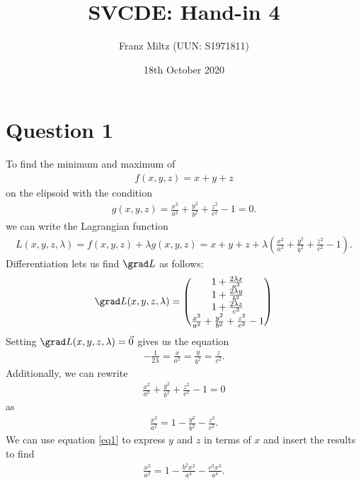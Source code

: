 \documentclass{article}
\begin{document}
\title{SVCDE: Hand-in 4}
\author{Franz Miltz (UUN: S1971811)}
\date{18th October 2020}
\maketitle


\section*{Question 1}


To find the minimum and maximum of
\begin{align*}
	f(x,y,z)=x + y + z
\end{align*}
on the elipsoid with the condition
\begin{align*}
	g(x,y,z)=\frac{x^2}{a^2} + \frac{y^2}{b^2} + \frac{z^2}{c^2}-1=0.
\end{align*}
we can write the Lagrangian function
\begin{align*}
	L(x,y,z,\lambda) = f(x,y,z)+\lambda g(x,y,z) =  x + y + z + \lambda\left(\frac{x^2}{a^2}+\frac{y^2}{b^2}+\frac{z^2}{c^2}-1\right).
\end{align*}
Differentiation lets us find $\grad L$ as follows:
\begin{align*}
	\grad L(x,y,z,\lambda)=\begin{pmatrix}
		1+\frac{2\lambda x}{a^2} \\
		1+\frac{2\lambda y}{b^2} \\
		1+\frac{2\lambda z}{c^2} \\
		\frac{x^2}{a^2}+\frac{y^2}{b^2}+\frac{z^2}{c^2}-1
	\end{pmatrix}
\end{align*}
Setting $\grad L(x,y,z,\lambda)=\vec 0$ gives us the equation
\begin{align}
	\label{eq1}
	-\frac{1}{2\lambda} = \frac{x}{a^2} = \frac{y}{b^2} = \frac{z}{c^2}.
\end{align}
Additionally, we can rewrite
\begin{align*}
	\frac{x^2}{a^2}+\frac{y^2}{b^2}+\frac{z^2}{c^2}-1=0
\end{align*}
as
\begin{align*}
	\frac{x^2}{a^2}=1-\frac{y^2}{b^2}-\frac{z^2}{c^2}.
\end{align*}
We can use equation \ref{eq1} to express $y$ and $z$ in terms of $x$ and
insert the results to find
\begin{align*}
	\frac{x^2}{a^2}=1-\frac{b^2x^2}{a^4}-\frac{c^2x^2}{a^4}.
\end{align*}
\end{document}
